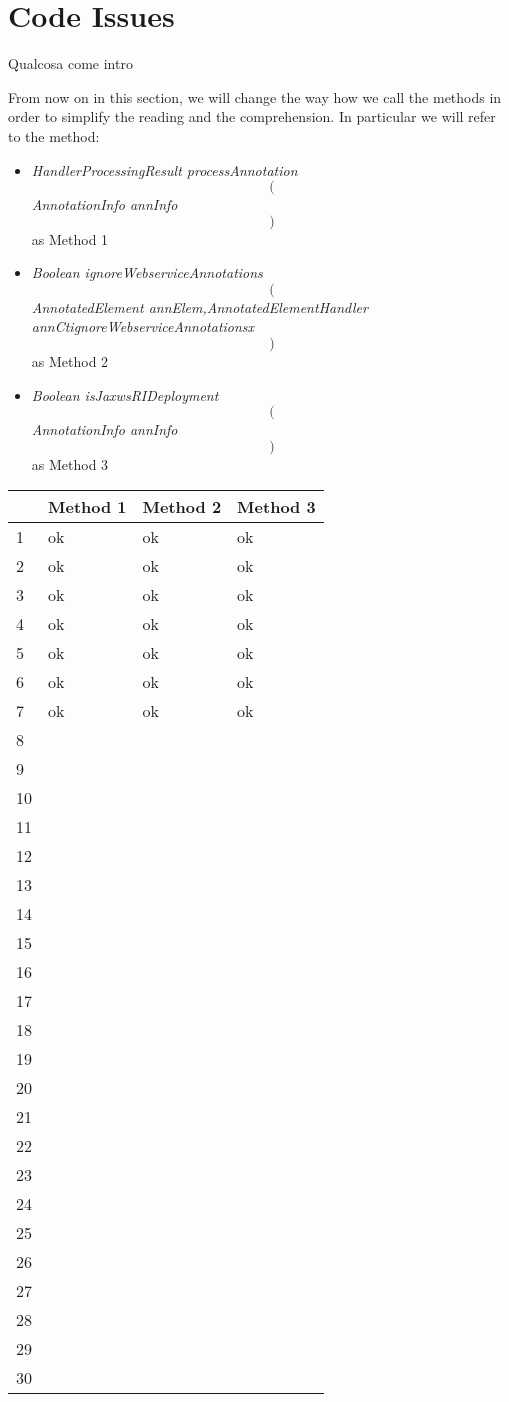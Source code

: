 \section{Code Issues}

Qualcosa come intro

From now on in this section, we will change the way how we call the methods in order to simplify the reading and the comprehension. \newline
In particular we will refer to the method:
\begin{itemize}
	\item \textit{HandlerProcessingResult processAnnotation $$($$AnnotationInfo annInfo$$)$$} as Method 1
	\item \textit{Boolean ignoreWebserviceAnnotations $$($$AnnotatedElement annElem,AnnotatedElementHandler annCtignoreWebserviceAnnotationsx$$)$$} as Method 2
	\item \textit{Boolean isJaxwsRIDeployment $$($$AnnotationInfo annInfo$$)$$} as Method 3
\end{itemize}

\newpage
\begin{tabular}{l|l|l|l}
\hline 
 & Method 1 & Method 2 & Method 3\\
\hline
1 & ok & ok & ok\\
\hline 
2 & ok & ok & ok\\
\hline
3 & ok & ok & ok\\
\hline
4 & ok & ok & ok\\
\hline
5 & ok & ok & ok\\
\hline
6 & ok & ok & ok\\
\hline
7 & ok & ok & ok\\
\hline
8 & & & \\
\hline
9 & & & \\
\hline
10 & & & \\
\hline
11 & & & \\
\hline
12 & & & \\
\hline
13 & & & \\
\hline
14 & & & \\
\hline
15 & & & \\
\hline
16 & & & \\
\hline
17 & & & \\
\hline
18 & & & \\
\hline
19 & & & \\
\hline
20 & & & \\
\hline
21 & & & \\
\hline
22 & & & \\
\hline
23 & & & \\
\hline
24 & & & \\
\hline
25 & & & \\
\hline
26 & & & \\
\hline
27 & & & \\
\hline
28 & & & \\
\hline
29 & & & \\
\hline
30 & & & \\
\end{tabular}
\newpage

